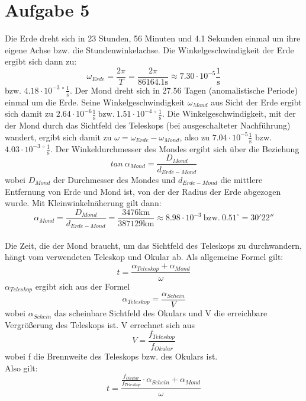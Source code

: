 \section{Aufgabe 5}
Die Erde dreht sich in 23 Stunden, 56 Minuten und 4.1 Sekunden einmal um ihre eigene Achse bzw. die Stundenwinkelachse.
Die Winkelgeschwindigkeit der Erde ergibt sich dann zu:
\begin{equation}
\omega_{Erde} = \frac{2\pi}{T} = \frac{2\pi}{86164.1 \mathrm{s}} \approx 7.30 \cdot 10^{-5} \frac{1}{\mathrm{s}}
\end{equation}
bzw. $4.18 \cdot 10^{-3\   \circ} \frac{1}{\mathrm{s}}$.
Der Mond dreht sich in 27.56 Tagen (anomalistische Periode) einmal um die Erde. Seine Winkelgeschwindigkeit $\omega_{Mond}$ aus Sicht der Erde ergibt sich damit zu $2.64\cdot 10^{-6} \frac{1}{\mathrm{s}}\ \textrm{bzw.}\ 1.51 \cdot 10^{-4\   \circ} \frac{1}{\mathrm{s}}$.
Die Winkelgeschwindigkeit, mit der der Mond durch das Sichtfeld des Teleskops (bei ausgeschalteter Nachführung) wandert, ergibt sich damit zu $\omega = \omega_{Erde}-\omega_{Mond}$, also zu $7.04\cdot 10^{-5} \frac{1}{\mathrm{s}}$ bzw. $4.03 \cdot 10^{-3\   \circ} \frac{1}{\mathrm{s}}$. 
Der Winkeldurchmesser des Mondes ergibt sich über die Beziehung
\begin{equation}
tan\  \alpha_{Mond} = \frac{D_{Mond}}{d_{Erde-Mond}}
\end{equation}
wobei $D_{Mond}$ der Durchmesser des Mondes und $d_{Erde-Mond}$ die mittlere Entfernung von Erde und Mond ist, von der der Radius der Erde abgezogen wurde.
Mit Kleinwinkelnäherung gilt dann:
\begin{equation}
\alpha_{Mond} = \frac{D_{Mond}}{d_{Erde-Mond}} = \frac{3476 \mathrm{km}}{387129 \mathrm{km}} \approx 8.98 \cdot 10^{-3}\ \mathrm{bzw.}\ 0.51^{\circ} = 30' 22''
\end{equation}
\\
Die Zeit, die der Mond braucht, um das Sichtfeld des Teleskops zu durchwandern, hängt vom verwendeten Teleskop und Okular ab.
Als allgemeine Formel gilt:
\begin{equation}
t = \frac{\alpha_{Teleskop}+\alpha_{Mond}}{\omega}
\end{equation}
$\alpha_{Teleskop}$ ergibt sich aus der Formel
\begin{equation}
\alpha_{Teleskop} = \frac{\alpha_{Schein}}{V}
\end{equation}
wobei $\alpha_{Schein}$ das scheinbare Sichtfeld des Okulars und V die erreichbare Vergrößerung des Teleskops ist. V errechnet sich aus
\begin{equation}
V = \frac{f_{Teleskop}}{f_{Okular}}
\end{equation}
wobei f die Brennweite des Teleskops bzw. des Okulars ist.
\\
Also gilt:
\begin{equation}
t = \frac{\frac{f_{Okular}}{f_{Teleskop}}\cdot \alpha_{Schein} + \alpha_{Mond}}{\omega}
\end{equation}

